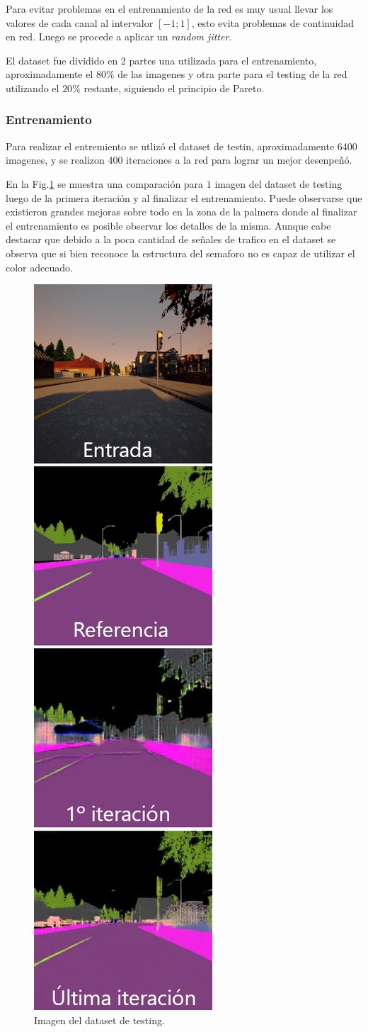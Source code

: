 \documentclass[]{IEEEtran}
\begin{document}
    Para evitar problemas en el entrenamiento de la red es muy usual llevar los valores de cada canal al 
    intervalor $[-1;1]$, esto evita problemas de continuidad en red. Luego 
    se procede a aplicar un \textit{random jitter}.

    El dataset fue dividido en 2 partes una utilizada para el entrenamiento, aproximadamente el $80 \% $ de las imagenes y 
    otra parte para el testing de la red utilizando el $20 \%$ restante, siguiendo el principio de Pareto.

    \subsubsection{Entrenamiento}

    Para realizar el entremiento se utlizó el dataset de testin, aproximadamente 6400 imagenes, 
    y se realizon 400 iteraciones a la red para lograr un mejor desenpeñó. 
    
    En la Fig.\ref{fig:results}
    se muestra una comparación para $1$ imagen del dataset de testing luego de la primera iteración 
    y al finalizar el entrenamiento.
    Puede observarse que existieron grandes mejoras sobre todo en la zona de la palmera
    donde al finalizar el entrenamiento es posible observar los detalles de la misma.
    Aunque cabe destacar que debido a la poca cantidad de señales de trafico en el dataset
    se observa que si bien reconoce la estructura del semaforo no es capaz de utilizar el color 
    adecuado.

    \begin{figure}[htb]
        \centering
        \includegraphics[width=.25\textwidth]{Imgs/results.jpeg}    
        \caption{Imagen del dataset de testing.}
        \label{fig:results}
    \end{figure}
\end{document}
